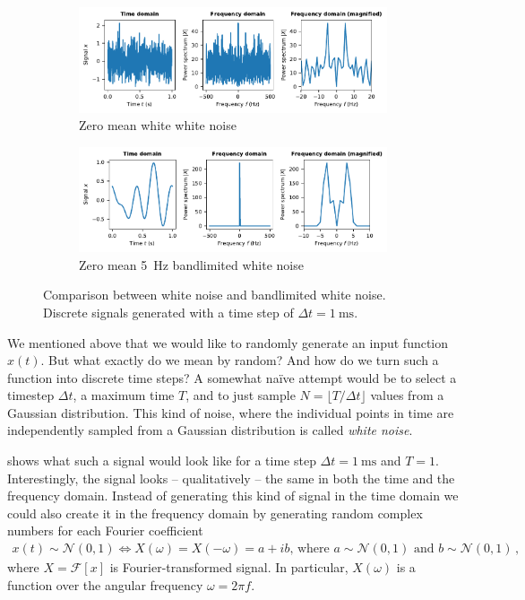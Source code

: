 \documentclass[10pt,letterpaper,oneside]{article}
\begin{document}
\begin{figure}
	\centering
	\begin{subfigure}{\textwidth}
		\centering
		\includegraphics{media/white_noise.pdf}
		\caption{Zero mean white white noise}
		\label{fig:white_noise}
	\end{subfigure}
	\begin{subfigure}{\textwidth}
		\centering
		\includegraphics{media/white_noise_5hz.pdf}
		\caption{Zero mean \SI{5}{\hertz} bandlimited white noise}
		\label{fig:white_noise_5hz}
	\end{subfigure}
	\caption{Comparison between white noise and bandlimited white noise. Discrete signals generated with a time step of $\Delta t = \SI{1}{\milli\second}$. }
\end{figure}

We mentioned above that we would like to randomly generate an input function $x(t)$. But what exactly do we mean by random? And how do we turn such a function into discrete time steps? A somewhat na\" ive attempt would be to select a timestep $\Delta t$, a maximum time $T$, and to just sample $N = \lfloor T / \Delta t \rfloor$ values from a Gaussian distribution. This kind of noise, where the individual points in time are independently sampled from a Gaussian distribution is called \emph{white noise}.

 shows what such a signal would look like for a time step $\Delta t = \SI{1}{\milli\second}$ and $T = 1$. Interestingly, the signal looks -- qualitatively -- the same in both the time and the frequency domain. Instead of generating this kind of signal in the time domain we could also create it in the frequency domain by generating random complex numbers for each Fourier coefficient
\begin{align*}
	x(t) \sim \mathcal{N}(0, 1) \Leftrightarrow X(\omega) = X(-\omega) = a + ib \text{, where } a \sim \mathcal{N}(0, 1) \text{ and } b \sim \mathcal{N}(0, 1) \,,
\end{align*}
where $X = \mathcal{F}[x]$ is Fourier-transformed signal. In particular, $X(\omega)$ is a function over the angular frequency $\omega = 2\pi f$.
\end{document}
